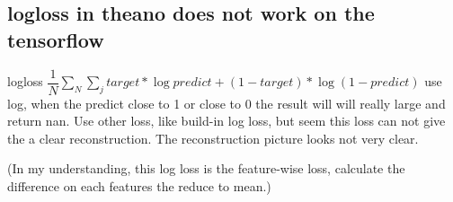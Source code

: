 \documentclass{article}
\begin{document}
\subsection{logloss in theano does not work on the tensorflow}
logloss $  \dfrac{1}{N}\sum_{N} \sum_{j} target * \log predict + (1 -target) * \log (1-predict) $ use log, when the predict close to 1 or close to 0 the result will will really large and return nan. Use other loss, like build-in log loss, but seem this loss can not give the a clear reconstruction. The reconstruction picture looks not very clear. 


(In my understanding, this log loss is the feature-wise loss, calculate the difference on each features the reduce to mean.)
\end{document}
